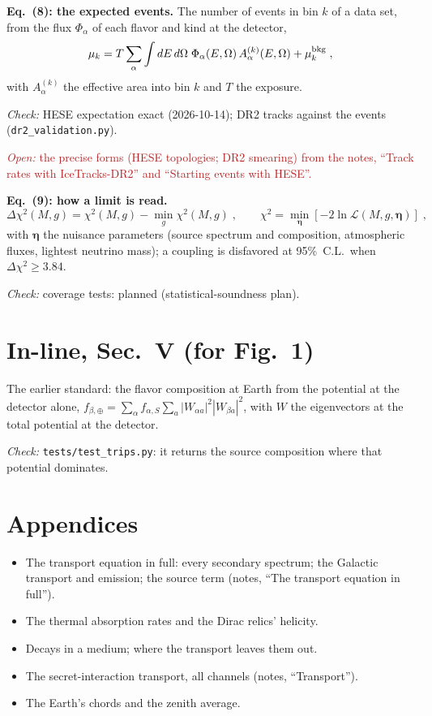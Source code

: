 \documentclass[11pt]{article}
\newcommand{\checked}[1]{\par\noindent\textit{Check:} #1}
\newcommand{\open}[1]{\par\noindent\textcolor{firebrick}{\textit{Open:} #1}}
\begin{document}
\textbf{Eq.~(8): the expected events.}
The number of events in bin $k$ of a data set, from the flux $\Phi_\alpha$ of each flavor and kind at the detector,
\begin{equation}
 \mu_k = T \sum_\alpha \int dE \, d\Omega \; \Phi_\alpha(E, \Omega)\, A^{(k)}_\alpha(E, \Omega) + \mu^{\rm bkg}_k \;,
\end{equation}
with $A^{(k)}_\alpha$ the effective area into bin $k$ and $T$ the exposure.
\checked{HESE expectation exact (2026-10-14); DR2 tracks against the events (\texttt{dr2\_validation.py}).}
\open{the precise forms (HESE topologies; DR2 smearing) from the notes, ``Track rates with IceTracks-DR2'' and ``Starting events with HESE''.}

\textbf{Eq.~(9): how a limit is read.}
\begin{equation}
 \Delta\chi^2(M, g) = \chi^2(M, g) - \min_{g} \chi^2(M, g) \;, \qquad \chi^2 = \min_{\boldsymbol{\eta}} \left[ -2 \ln \mathcal{L}(M, g, \boldsymbol{\eta}) \right] \;,
\end{equation}
with $\boldsymbol{\eta}$ the nuisance parameters (source spectrum and composition, atmospheric fluxes, lightest neutrino mass); a coupling is disfavored at 95\%~C.L.\ when $\Delta\chi^2 \geq 3.84$.
\checked{coverage tests: planned (statistical-soundness plan).}

\section*{In-line, Sec.~V (for Fig.~1)}

The earlier standard: the flavor composition at Earth from the potential at the detector alone,
$f_{\beta,\oplus} = \sum_\alpha f_{\alpha,S} \sum_a |W_{\alpha a}|^2 |W_{\beta a}|^2$, with $W$ the eigenvectors at the total potential at the detector.
\checked{\texttt{tests/test\_trips.py}: it returns the source composition where that potential dominates.}

\section*{Appendices}

\begin{itemize}[leftmargin=*,itemsep=0pt]
 \item The transport equation in full: every secondary spectrum; the Galactic transport and emission; the source term (notes, ``The transport equation in full'').
 \item The thermal absorption rates and the Dirac relics' helicity.
 \item Decays in a medium; where the transport leaves them out.
 \item The secret-interaction transport, all channels (notes, ``Transport'').
 \item The Earth's chords and the zenith average.
\end{itemize}
\end{document}
